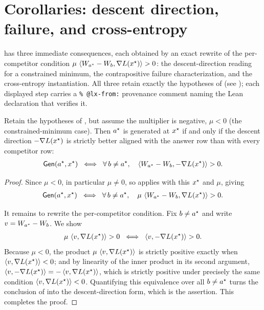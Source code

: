 \section{Corollaries: descent direction, failure, and cross-entropy}
\label{sec:corollaries}

 has three immediate consequences, each obtained by an exact rewrite of the
per-competitor condition $\mu\,\left\langle W_{a^{\star}} - W_{b}, \nabla L(x^{\star}) \right\rangle > 0$: the
descent-direction reading for a constrained minimum, the contrapositive failure
characterization, and the cross-entropy instantiation. All three retain exactly the
hypotheses of  (see ); each displayed step carries a
\verb|% @lx-from:| provenance comment naming the Lean declaration that verifies it.

\begin{corollary}
\label{cor:neg}
Retain the hypotheses of , but assume the multiplier is negative, $\mu < 0$
(the constrained-minimum case). Then $a^{\star}$ is generated at $x^{\star}$ if and only if the
descent direction $-\nabla L(x^{\star})$ is strictly better aligned with the answer row than
with every competitor row:
\begin{align*}
\mathsf{Gen}(a^{\star}, x^{\star})
\;\iff\;
\forall\, b \ne a^{\star},\quad \left\langle W_{a^{\star}} - W_{b}, -\nabla L(x^{\star}) \right\rangle > 0.
\end{align*}
\end{corollary}

\begin{proof}
Since $\mu < 0$, in particular $\mu \ne 0$, so  applies with this $x^{\star}$ and
$\mu$, giving
\begin{align*}
\mathsf{Gen}(a^{\star}, x^{\star})
\;\iff\;
\forall\, b \ne a^{\star},\quad \mu\,\left\langle W_{a^{\star}} - W_{b}, \nabla L(x^{\star}) \right\rangle > 0.
\end{align*}

It remains to rewrite the per-competitor condition. Fix $b \ne a^{\star}$ and write
$v = W_{a^{\star}} - W_{b}$. We show
\begin{align*}
\mu\,\left\langle v, \nabla L(x^{\star}) \right\rangle > 0
\;\iff\;
\left\langle v, -\nabla L(x^{\star}) \right\rangle > 0.
\end{align*}
Because $\mu < 0$, the product $\mu\,\left\langle v, \nabla L(x^{\star}) \right\rangle$ is strictly positive
exactly when $\left\langle v, \nabla L(x^{\star}) \right\rangle < 0$; and by linearity of the inner product in its
second argument, $\left\langle v, -\nabla L(x^{\star}) \right\rangle = -\left\langle v, \nabla L(x^{\star}) \right\rangle$, which is
strictly positive under precisely the same condition $\left\langle v, \nabla L(x^{\star}) \right\rangle < 0$.
Quantifying this equivalence over all $b \ne a^{\star}$ turns the conclusion of 
into the descent-direction form, which is the assertion. This completes the proof.
\end{proof}

